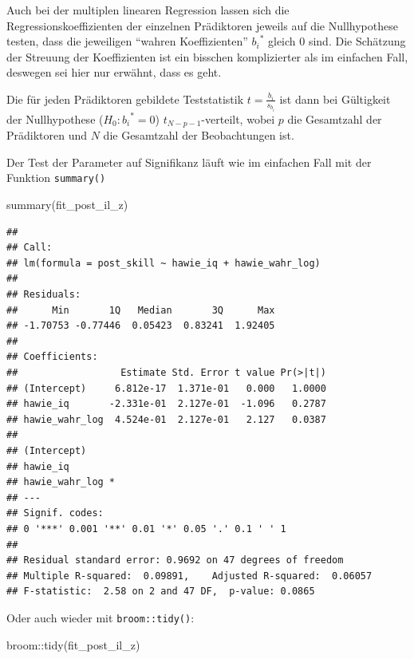 \documentclass[
]{book}
\newenvironment{Shaded}{\begin{snugshade}}{\end{snugshade}}
\newcommand{\FunctionTok}[1]{\textcolor[rgb]{0.00,0.00,0.00}{#1}}
\newcommand{\NormalTok}[1]{#1}
\newcommand{\SpecialCharTok}[1]{\textcolor[rgb]{0.00,0.00,0.00}{#1}}
\begin{document}
Auch bei der multiplen linearen Regression lassen sich die Regressionskoeffizienten der einzelnen Prädiktoren jeweils auf die Nullhypothese testen, dass die jeweiligen ``wahren Koeffizienten'' \({b_i}^*\) gleich 0 sind. Die Schätzung der Streuung der Koeffizienten ist ein bisschen komplizierter als im einfachen Fall, deswegen sei hier nur erwähnt, dass es geht.

Die für jeden Prädiktoren gebildete Teststatistik \(t = \frac{b_i}{s_{b_{i}}}\) ist dann bei Gültigkeit der Nullhypothese (\(H_0:{b_i}^* = 0\)) \(t_{N-p-1}\)-verteilt, wobei \(p\) die Gesamtzahl der Prädiktoren und \(N\) die Gesamtzahl der Beobachtungen ist.

Der Test der Parameter auf Signifikanz läuft wie im einfachen Fall mit der Funktion \texttt{summary()}

\begin{Shaded}
\begin{Highlighting}[]
\FunctionTok{summary}\NormalTok{(fit\_post\_il\_z)}
\end{Highlighting}
\end{Shaded}

\begin{verbatim}
## 
## Call:
## lm(formula = post_skill ~ hawie_iq + hawie_wahr_log)
## 
## Residuals:
##      Min       1Q   Median       3Q      Max 
## -1.70753 -0.77446  0.05423  0.83241  1.92405 
## 
## Coefficients:
##                  Estimate Std. Error t value Pr(>|t|)
## (Intercept)     6.812e-17  1.371e-01   0.000   1.0000
## hawie_iq       -2.331e-01  2.127e-01  -1.096   0.2787
## hawie_wahr_log  4.524e-01  2.127e-01   2.127   0.0387
##                 
## (Intercept)     
## hawie_iq        
## hawie_wahr_log *
## ---
## Signif. codes:  
## 0 '***' 0.001 '**' 0.01 '*' 0.05 '.' 0.1 ' ' 1
## 
## Residual standard error: 0.9692 on 47 degrees of freedom
## Multiple R-squared:  0.09891,    Adjusted R-squared:  0.06057 
## F-statistic:  2.58 on 2 and 47 DF,  p-value: 0.0865
\end{verbatim}

Oder auch wieder mit \texttt{broom::tidy()}:

\begin{Shaded}
\begin{Highlighting}[]
\NormalTok{broom}\SpecialCharTok{::}\FunctionTok{tidy}\NormalTok{(fit\_post\_il\_z)}
\end{Highlighting}
\end{Shaded}

 
  \providecommand{\huxb}[2]{\arrayrulecolor[RGB]{#1}\global\arrayrulewidth=#2pt}
  \providecommand{\huxvb}[2]{\color[RGB]{#1}\vrule width #2pt}
  \providecommand{\huxtpad}[1]{\rule{0pt}{#1}}
  \providecommand{\huxbpad}[1]{\rule[-#1]{0pt}{#1}}
\end{document}
